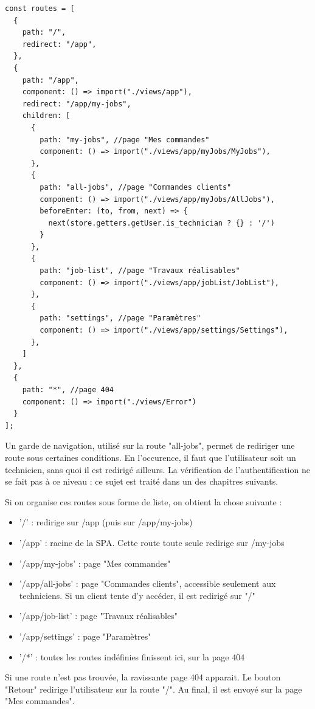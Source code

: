 \documentclass[
    iai, %
    eai, %
]{heig-tb}
\begin{document}
\begin{verbatim}
const routes = [
  {
    path: "/",
    redirect: "/app",
  },
  {
    path: "/app",
    component: () => import("./views/app"),
    redirect: "/app/my-jobs",
    children: [
      {
        path: "my-jobs", //page "Mes commandes"
        component: () => import("./views/app/myJobs/MyJobs"),
      },
      {
        path: "all-jobs", //page "Commandes clients"
        component: () => import("./views/app/myJobs/AllJobs"),
        beforeEnter: (to, from, next) => {
          next(store.getters.getUser.is_technician ? {} : '/')
        }
      },
      {
        path: "job-list", //page "Travaux réalisables"
        component: () => import("./views/app/jobList/JobList"),
      },
      {
        path: "settings", //page "Paramètres"
        component: () => import("./views/app/settings/Settings"),
      },
    ]
  },
  {
    path: "*", //page 404
    component: () => import("./views/Error")
  }
];
\end{verbatim}

Un garde de navigation, utilisé sur la route "all-jobs", permet de rediriger une route sous certaines conditions. En l'occurence, il faut que l'utilisateur soit un technicien, sans quoi il est redirigé ailleurs. La vérification de l'authentification ne se fait pas à ce niveau : ce sujet est traité dans un des chapitres suivants.

\newpage
Si on organise ces routes sous forme de liste, on obtient la chose suivante :
\begin{itemize}
  \item '/' : redirige sur /app (puis sur /app/my-jobs)
  \item '/app' : racine de la SPA. Cette route toute seule redirige sur /my-jobs
  \item '/app/my-jobs' : page "Mes commandes"
  \item '/app/all-jobs' : page "Commandes clients", accessible seulement aux techniciens. Si un client tente d'y accéder, il est redirigé sur "/"
  \item '/app/job-list' : page "Travaux réalisables"
  \item '/app/settings' : page "Paramètres"
  \item '/*' : toutes les routes indéfinies finissent ici, sur la page 404
\end{itemize}
\bigskip

Si une route n'est pas trouvée, la ravissante page 404 apparait. Le bouton "Retour" redirige l'utilisateur sur la route "/". Au final, il est envoyé sur la page "Mes commandes".
\end{document}
